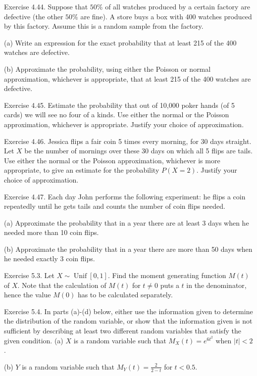 \documentclass[10pt]{article}
\begin{document}
\hfill \break
Exercise 4.44. Suppose that $50 \%$ of all watches produced by a certain factory are defective (the other $50 \%$ are fine). A store buys a box with 400 watches produced by this factory. Assume this is a random sample from the factory.

(a) Write an expression for the exact probability that at least 215 of the 400 watches are defective.

(b) Approximate the probability, using either the Poisson or normal approximation, whichever is appropriate, that at least 215 of the 400 watches are defective.

\hfill \break
Exercise 4.45. Estimate the probability that out of 10,000 poker hands (of 5 cards) we will see no four of a kinds. Use either the normal or the Poisson approximation, whichever is appropriate. Justify your choice of approximation.

\hfill \break
Exercise 4.46. Jessica flips a fair coin 5 times every morning, for 30 days straight. Let $X$ be the number of mornings over these 30 days on which all 5 flips are tails. Use either the normal or the Poisson approximation, whichever is more appropriate, to give an estimate for the probability $P(X=2)$. Justify your choice of approximation.

\hfill \break
Exercise 4.47. Each day John performs the following experiment: he flips a coin repeatedly until he gets tails and counts the number of coin flips needed.

(a) Approximate the probability that in a year there are at least 3 days when he needed more than 10 coin flips.

(b) Approximate the probability that in a year there are more than 50 days when he needed exactly 3 coin flips.

\hfill \break
Exercise 5.3. Let $X \sim \operatorname{Unif}[0,1]$. Find the moment generating function $M(t)$ of $X$. Note that the calculation of $M(t)$ for $t \neq 0$ puts a $t$ in the denominator, hence the value $M(0)$ has to be calculated separately.

\hfill \break
Exercise 5.4. In parts (a)-(d) below, either use the information given to determine the distribution of the random variable, or show that the information given is not sufficient by describing at least two different random variables that satisfy the given condition. (a) $X$ is a random variable such that $M_{X}(t)=e^{6 t^{2}}$ when $|t|<2$.

(b) $Y$ is a random variable such that $M_{Y}(t)=\frac{2}{2-t}$ for $t<0.5$.
\end{document}
